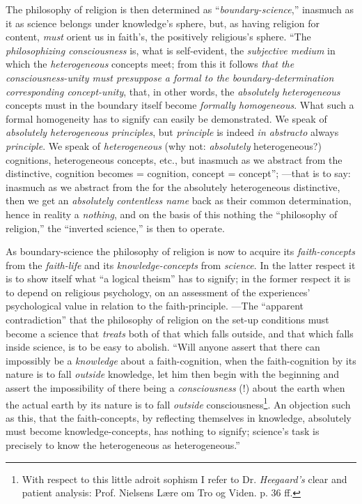 \documentclass[12pt,a4paper]{book}
\begin{document}
The philosophy of religion is then determined as ``\emph{boundary-science},'' inasmuch as it as science belongs under
knowledge's sphere, but, as having religion for content, \emph{must} orient us in faith's, the positively religious's
sphere. ``The \emph{philosophizing consciousness} is, what is self-evident, the \emph{subjective medium} in which the
\emph{heterogeneous} concepts meet; from this it follows \emph{that the consciousness-unity must presuppose a formal to
the boundary-determination corresponding concept-unity}, that, in other words, the \emph{absolutely heterogeneous}
concepts must in the boundary itself become \emph{formally homogeneous}. What such a formal homogeneity has to signify
can easily be demonstrated. We speak of \emph{absolutely heterogeneous principles}, but \emph{principle} is indeed
\emph{\textit{in abstracto}} always \emph{principle}. We speak of \emph{heterogeneous} (why not: \emph{absolutely} heterogeneous?) cognitions,
heterogeneous concepts, etc., but inasmuch as we abstract from the distinctive, cognition becomes = cognition,
concept = concept''; ---that is to say: inasmuch as we abstract from the for the absolutely heterogeneous
distinctive, then we get an \emph{absolutely contentless name} back as their common determination, hence in reality
a \emph{nothing}, and on the basis of this nothing the ``philosophy of religion,'' the ``inverted science,'' is then to
operate.

As boundary-science the philosophy of religion is now to acquire its \emph{faith-concepts} from the \emph{faith-life} and
its \emph{knowledge-concepts} from \emph{science}. In the latter respect it is to show itself what ``a logical theism''
has to signify; in the former respect it is to depend on religious psychology, on an assessment of the experiences'
psychological value in relation to the faith-principle. ---The ``apparent contradiction'' that the philosophy of
religion on the set-up conditions must become a science that \emph{treats} both of that which falls outside, and that
which falls inside science, is to be easy to abolish. ``Will anyone assert that there can impossibly be a \emph{knowledge}
about a faith-cognition, when the faith-cognition by its nature is to fall \emph{outside} knowledge, let him then
begin with the beginning and assert the impossibility of there being a \emph{consciousness} (!) about the earth when the
actual earth by its nature is to fall \emph{outside} consciousness\footnote{With respect to this little adroit
sophism I refer to Dr. \emph{Heegaard's} clear and patient analysis: Prof. Nielsens Lære om Tro og Viden. p. 36 ff.}. An
objection such as this, that the faith-concepts, by reflecting themselves in knowledge, absolutely must become
knowledge-concepts, has nothing to signify; science's task is precisely to know the heterogeneous as
heterogeneous.''
\end{document}
